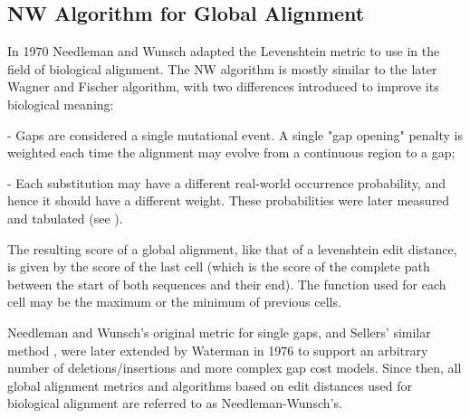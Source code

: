 




\subsection{\ac{NW} Algorithm for Global Alignment}

In 1970 \cite{needlemanwunsch} Needleman and Wunsch adapted the Levenshtein metric to use in the field of biological alignment. The \ac{NW} algorithm is mostly similar to the later Wagner and Fischer algorithm, with two differences introduced to improve its biological meaning:

	- Gaps are considered a single mutational event. A single "gap opening" penalty is weighted each time the alignment may evolve from a continuous region to a gap;

	- Each substitution may have a different real-world occurrence probability, and hence it should have a different weight. These probabilities were later measured and tabulated (see ).

The resulting score of a global alignment, like that of a levenshtein edit distance, is given by the score of the last cell (which is the score of the complete path between the start of both sequences and their end). The function used for each cell may be the maximum or the minimum of previous cells.

Needleman and Wunsch's original metric for single gaps, and Sellers' similar method \cite{smith1981comparative}, were later extended by Waterman in 1976 \cite{waterman1976some} to support an arbitrary number of deletions/insertions and more complex gap cost models. Since then, all global alignment metrics and algorithms based on edit distances used for biological alignment are referred to as Needleman-Wunsch's.

